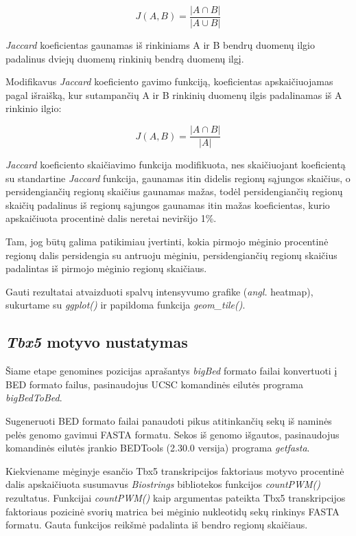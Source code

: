 \documentclass[12pt]{article}
\begin{document}
                \[ J(A, B) =  \frac{|A \cap B|}{|A \cup B|} \]

\emph{Jaccard} koeficientas gaunamas iš rinkiniams A ir B bendrų duomenų ilgio
padalinus dviejų duomenų rinkinių bendrą duomenų ilgį.

Modifikavus \emph{Jaccard} koeficiento gavimo funkciją, koeficientas
apskaičiuojamas pagal išraišką, kur sutampančių A ir B rinkinių duomenų ilgis
padalinamas iš A rinkinio ilgio:

                    \[ J(A, B) = \frac{|A \cap B|}{|A|} \]

\emph{Jaccard} koeficiento skaičiavimo funkcija modifikuota, nes skaičiuojant
koeficientą su standartine \emph{Jaccard} funkcija, gaunamas itin didelis
regionų sąjungos skaičius, o persidengiančių regionų skaičius gaunamas mažas,
todėl persidengiančių regionų skaičių padalinus iš regionų sąjungos gaunamas
itin mažas koeficientas, kurio apskaičiuota procentinė dalis neretai neviršijo
1\%.

Tam, jog būtų galima patikimiau įvertinti, kokia pirmojo mėginio procentinė
regionų dalis persidengia su antruoju mėginiu, persidengiančių regionų skaičius
padalintas iš pirmojo mėginio regionų skaičiaus.

Gauti rezultatai atvaizduoti spalvų intensyvumo grafike (\emph{angl.} heatmap),
sukurtame su \emph{ggplot()} ir papildoma funkcija \emph{geom\_tile()}.

\subsection{\emph{Tbx5} motyvo nustatymas}
Šiame etape genomines pozicijas aprašantys \emph{bigBed} formato failai
konvertuoti į BED formato failus, pasinaudojus UCSC komandinės eilutės programa
\emph{bigBedToBed}\cite {BBTOBED}.

Sugeneruoti BED formato failai panaudoti pikus atitinkančių sekų iš naminės
pelės genomo gavimui FASTA formatu. Sekos iš genomo išgautos, pasinaudojus
komandinės eilutės įrankio BEDTools\cite{BEDTOOLS} (2.30.0 versija) programa
\emph{getfasta}\cite{GET_FASTA}.

Kiekviename mėginyje esančio Tbx5 transkripcijos faktoriaus motyvo procentinė
dalis apskaičiuota susumavus \emph{Biostrings}\cite{BIOSTR} bibliotekos
funkcijos \emph{countPWM()} rezultatus. Funkcijai \emph{countPWM()} kaip
argumentas pateikta Tbx5 transkripcijos faktoriaus pozicinė svorių matrica bei
mėginio nukleotidų sekų rinkinys FASTA formatu. Gauta funkcijos reikšmė
padalinta iš bendro regionų skaičiaus.
\end{document}
